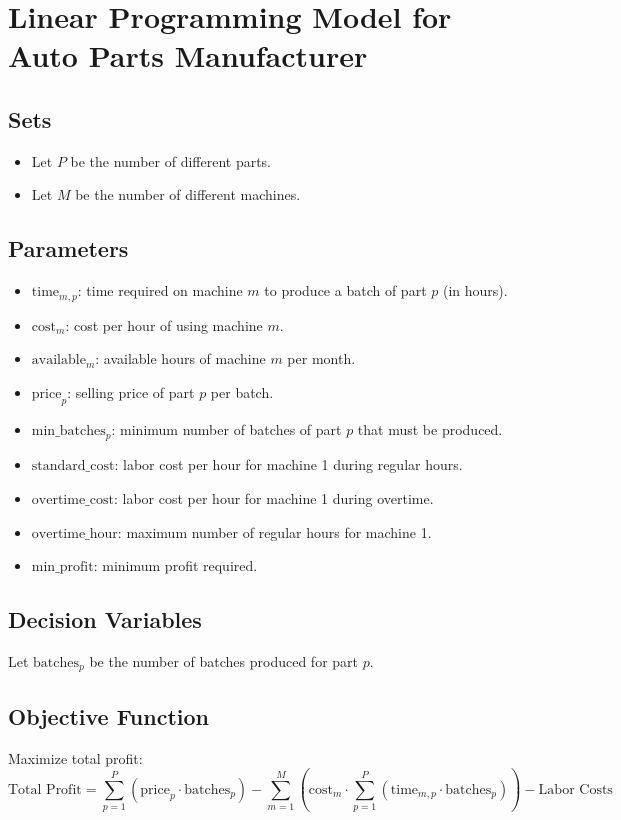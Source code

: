 \documentclass{article}
\begin{document}
\section*{Linear Programming Model for Auto Parts Manufacturer}

\subsection*{Sets}
\begin{itemize}
    \item Let \( P \) be the number of different parts.
    \item Let \( M \) be the number of different machines.
\end{itemize}

\subsection*{Parameters}
\begin{itemize}
    \item \( \text{time}_{m,p} \): time required on machine \( m \) to produce a batch of part \( p \) (in hours).
    \item \( \text{cost}_{m} \): cost per hour of using machine \( m \).
    \item \( \text{available}_{m} \): available hours of machine \( m \) per month.
    \item \( \text{price}_{p} \): selling price of part \( p \) per batch.
    \item \( \text{min\_batches}_{p} \): minimum number of batches of part \( p \) that must be produced.
    \item \( \text{standard\_cost} \): labor cost per hour for machine 1 during regular hours.
    \item \( \text{overtime\_cost} \): labor cost per hour for machine 1 during overtime.
    \item \( \text{overtime\_hour} \): maximum number of regular hours for machine 1.
    \item \( \text{min\_profit} \): minimum profit required.
\end{itemize}

\subsection*{Decision Variables}
Let \( \text{batches}_{p} \) be the number of batches produced for part \( p \).

\subsection*{Objective Function}
Maximize total profit:
\[
\text{Total Profit} = \sum_{p=1}^{P} (\text{price}_{p} \cdot \text{batches}_{p}) - \sum_{m=1}^{M} \left( \text{cost}_{m} \cdot \sum_{p=1}^{P} (\text{time}_{m,p} \cdot \text{batches}_{p}) \right) - \text{Labor Costs}
\]
\end{document}
